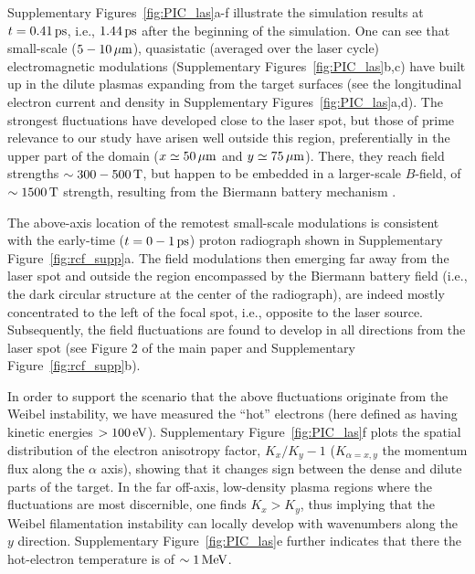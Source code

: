 \documentclass[aps,superscriptaddress]{revtex4}
\begin{document}
Supplementary Figures~\ref{fig:PIC_las}a-f illustrate the simulation results at $t = 0.41\,\rm ps$, i.e., $1.44\,\rm ps$ after the beginning of the simulation. One can see that small-scale ($5-10\,\rm \mu m$), quasistatic (averaged over the laser cycle) electromagnetic modulations (Supplementary Figures~\ref{fig:PIC_las}b,c) have built up in the dilute plasmas expanding from the target surfaces (see the longitudinal electron current and density in Supplementary Figures~\ref{fig:PIC_las}a,d). The strongest fluctuations have developed close to the laser spot, but those of prime relevance to our study have arisen well outside this region, preferentially in the upper part of the domain ($x\simeq 50\,\rm \mu m$ and $y\simeq 75\,\rm \mu m$). There, they reach field strengths $\sim 300-500\,\rm T$, but happen to be embedded in a larger-scale $B$-field, of $\sim 1500\,\rm T$ strength, resulting from the Biermann battery mechanism \cite{PRL_Schoeffler_2014, PRL_Haines_1997}.

The above-axis location of the remotest small-scale modulations is consistent with the early-time ($t=0-1\,\rm ps$) proton radiograph shown in Supplementary Figure~\ref{fig:rcf_supp}a. The field modulations then emerging far away from the laser spot and outside the region encompassed by the Biermann battery field (i.e., the dark circular structure at the center of the radiograph), are indeed mostly concentrated to the left of the focal spot, i.e., opposite to the laser source.
Subsequently, the field fluctuations are found to develop in all directions from the laser spot (see Figure 2 of the main paper and Supplementary Figure~\ref{fig:rcf_supp}b).

In order to support the scenario that the above fluctuations originate from the Weibel instability, we have measured the ``hot'' electrons (here defined as having kinetic energies $>100\,\rm eV$). Supplementary Figure~\ref{fig:PIC_las}f plots the spatial distribution of the electron anisotropy factor, $K_x/K_y-1$ ($K_{\alpha=x,y}$ the momentum flux along the $\alpha$ axis), showing that it changes sign between the dense and dilute parts of the target. In the far off-axis, low-density plasma regions where the fluctuations are most discernible, one finds $K_x > K_y$, thus implying that the Weibel filamentation instability can locally develop with wavenumbers along the $y$ direction. Supplementary Figure~\ref{fig:PIC_las}e further indicates that there the hot-electron temperature is of $\sim 1\,\rm MeV$.
\end{document}
